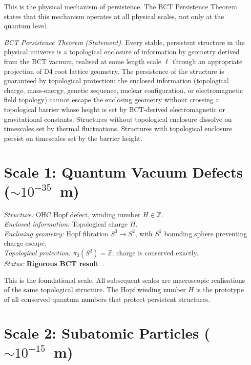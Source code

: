 \documentclass[aps,prl,preprint,superscriptaddress,floatfix]{revtex4-2}
\begin{document}
This is the physical mechanism of persistence. The BCT Persistence
Theorem states that this mechanism operates at all physical scales,
not only at the quantum level.

\textit{BCT Persistence Theorem (Statement).}
Every stable, persistent structure in the physical universe is a
topological enclosure of information by geometry derived from the
BCT vacuum, realised at some length scale $\ell$ through an appropriate
projection of D4 root lattice geometry. The persistence of the
structure is guaranteed by topological protection: the enclosed
information (topological charge, mass-energy, genetic sequence,
nuclear configuration, or electromagnetic field topology) cannot
escape the enclosing geometry without crossing a topological barrier
whose height is set by BCT-derived electromagnetic or gravitational
constants. Structures without topological enclosure dissolve on
timescales set by thermal fluctuations. Structures with topological
enclosure persist on timescales set by the barrier height.

\section{Scale 1: Quantum Vacuum Defects ($\sim 10^{-35}$~m)}

\textit{Structure:} OHC Hopf defect, winding number $H \in \mathbb{Z}$.\\
\textit{Enclosed information:} Topological charge $H$.\\
\textit{Enclosing geometry:} Hopf fibration $S^3 \to S^2$, with
$S^2$ bounding sphere preventing charge escape.\\
\textit{Topological protection:} $\pi_3(S^2) = \mathbb{Z}$; charge
is conserved exactly.\\
\textit{Status:} \textbf{Rigorous BCT result}~\cite{bctjh,bct64}.

This is the foundational scale. All subsequent scales are macroscopic
realisations of the same topological structure. The Hopf winding
number $H$ is the prototype of all conserved quantum numbers that
protect persistent structures.

\section{Scale 2: Subatomic Particles ($\sim 10^{-15}$~m)}
\end{document}
